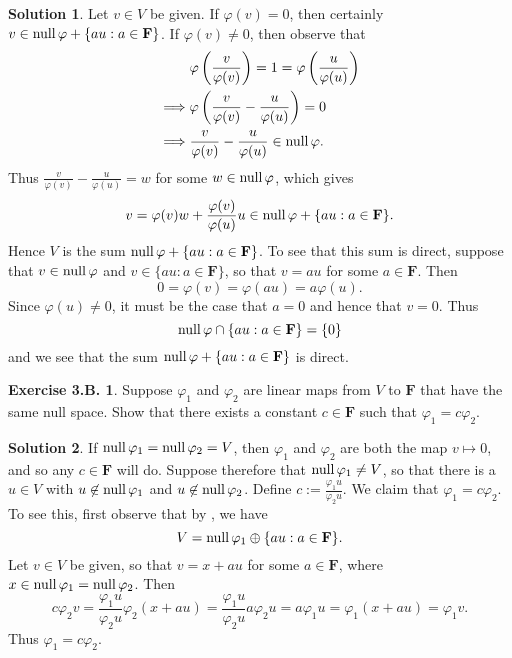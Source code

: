 \documentclass[12pt]{article}
\theoremstyle{definition}
\theoremstyle{exercise}
\newtheorem{exercise}{Exercise 3.B.}
\theoremstyle{solution}
\newtheorem*{solution}{Solution}
\newcommand{\Null}{\text{null\,}}
\newcommand{\F}{\mathbf{F}}
\begin{document}
\begin{solution}
    Let \( v \in V \) be given. If \( \varphi(v) = 0 \), then certainly \( v \in \Null \varphi + \{ au : a \in \F \} \). If \( \varphi(v) \neq 0 \), then observe that
    \begin{align*}
        & \varphi \left( \frac{v}{\varphi(v)} \right) = 1 = \varphi \left( \frac{u}{\varphi(u)} \right) \\
        \implies & \varphi \left( \frac{v}{\varphi(v)} - \frac{u}{\varphi(u)} \right) = 0 \\
        \implies & \frac{v}{\varphi(v)} - \frac{u}{\varphi(u)} \in \Null \varphi.
    \end{align*}
    Thus \( \frac{v}{\varphi(v)} - \frac{u}{\varphi(u)} = w \) for some \( w \in \Null \varphi \), which gives
    \[
        v = \varphi(v) w + \frac{\varphi(v)}{\varphi(u)} u \in \Null \varphi + \{ au : a \in \F \}.
    \]
    Hence \( V \) is the sum \( \Null \varphi + \{ au : a \in \F \} \). To see that this sum is direct, suppose that \( v \in \Null \varphi \) and \( v \in \{ au : a \in \F \} \), so that \( v = au \) for some \( a \in \F \). Then
    \[
        0 = \varphi(v) = \varphi(au) = a \varphi(u).
    \]
    Since \( \varphi(u) \neq 0 \), it must be the case that \( a = 0 \) and hence that \( v = 0 \). Thus
    \[
        \Null \varphi \cap \{ au : a \in \F \} = \{ 0 \}
    \]    
    and we see that the sum \( \Null \varphi + \{ au : a \in \F \} \) is direct.
\end{solution}

\begin{exercise}
\label{ex:30}
    Suppose \( \varphi_1 \) and \( \varphi_2 \) are linear maps from \( V \) to \( \F \) that have the same null space. Show that there exists a constant \( c \in \F \) such that \( \varphi_1 = c \varphi_2 \).
\end{exercise}

\begin{solution}
    If \( \Null \varphi_1 = \Null \varphi_2 = V \), then \( \varphi_1 \) and \( \varphi_2 \) are both the map \( v \mapsto 0 \), and so any \( c \in \F \) will do. Suppose therefore that \( \Null \varphi_1 \neq V \), so that there is a \( u \in V \) with \( u \not\in \Null \varphi_1 \) and \( u \not\in \Null \varphi_2 \). Define \( c := \tfrac{\varphi_1 u}{\varphi_2 u} \). We claim that \( \varphi_1 = c \varphi_2 \). To see this, first observe that by , we have
    \[
        V = \Null \varphi_1 \oplus \{ au : a \in \F \}.
    \]
    Let \( v \in V \) be given, so that \( v = x + au \) for some \( a \in \F \), where \( x \in \Null \varphi_1 = \Null \varphi_2 \). Then
    \[
        c \varphi_2 v = \frac{\varphi_1 u}{\varphi_2 u} \varphi_2(x + au) = \frac{\varphi_1 u}{\varphi_2 u} a \varphi_2 u = a \varphi_1 u = \varphi_1(x + au) = \varphi_1 v.
    \]
    Thus \( \varphi_1 = c \varphi_2 \).
\end{solution}
\end{document}

